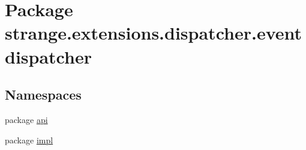 \hypertarget{namespacestrange_1_1extensions_1_1dispatcher_1_1eventdispatcher}{\section{Package strange.\-extensions.\-dispatcher.\-eventdispatcher}
\label{namespacestrange_1_1extensions_1_1dispatcher_1_1eventdispatcher}
}
\subsection*{Namespaces}
\begin{DoxyCompactItemize}
\item 
package \hyperlink{namespacestrange_1_1extensions_1_1dispatcher_1_1eventdispatcher_1_1api}{api}
\item 
package \hyperlink{namespacestrange_1_1extensions_1_1dispatcher_1_1eventdispatcher_1_1impl}{impl}
\end{DoxyCompactItemize}
